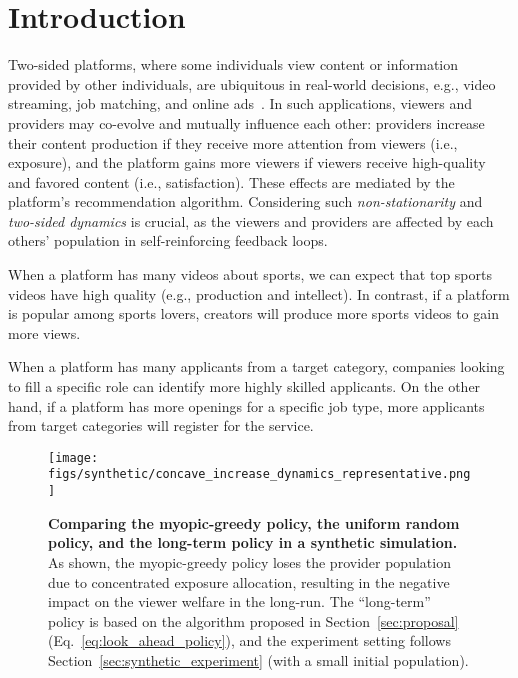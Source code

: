 \section{Introduction} 

Two-sided platforms, where some individuals view content or information provided by other individuals, are ubiquitous in real-world decisions, e.g., video streaming, job matching, and online ads~\citep{boutilier2023modeling}. 
In such applications, viewers and providers may co-evolve and mutually influence each other: providers increase their content production if they receive more attention from viewers (i.e., exposure), and the platform gains more viewers if viewers receive high-quality and favored content (i.e., satisfaction). 
These effects are mediated by the platform's recommendation algorithm.
Considering such \textit{non-stationarity} and \textit{two-sided dynamics} is crucial, as the viewers and providers are affected by each others' population in self-reinforcing feedback loops.

\begin{example}
    When a platform has many videos about sports, we can expect that top sports videos have high quality (e.g., production and intellect). In contrast, if a platform is popular among sports lovers, creators will produce more sports videos to gain more views.
\end{example}

\begin{example} 
    When a platform has many applicants from a target category, companies looking to fill a specific role can identify more highly skilled applicants. 
    On the other hand, if a platform has more openings for a specific job type, more applicants from target categories will register for the service. 
\end{example}

\begin{figure*}[t]
\centering
\texttt{[image: figs/synthetic/concave\_increase\_dynamics\_representative.png]}
    \caption{\textbf{Comparing the myopic-greedy policy, the uniform random policy, and the long-term policy in a synthetic simulation.} 
    As shown, the myopic-greedy policy loses the provider population due to concentrated exposure allocation, resulting in the negative impact on the viewer welfare in the long-run.
    The ``long-term'' policy is based on the algorithm proposed in Section~\ref{sec:proposal} (Eq.~\eqref{eq:look_ahead_policy}), and the experiment setting follows Section~\ref{sec:synthetic_experiment} (with a small initial population).
  } 
  \label{fig:example}
\end{figure*}

